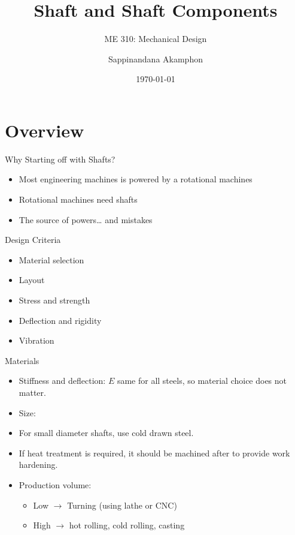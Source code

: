 \documentclass[10pt, svgnames]{beamer}
\author{Sappinandana Akamphon}
\date{\today}
\title{Shaft and Shaft Components}
\subtitle{ME 310: Mechanical Design}
\institute{Department of Mechanical Engineering, TSE}
\date{}
\begin{document}
\maketitle

\section{Overview}
\label{sec:org99923cc}

\begin{frame}[label={sec:org2977922}]{Why Starting off with Shafts?}
\begin{itemize}
\item Most engineering machines is powered by a rotational machines
\item Rotational machines need shafts
\item The source of powers\ldots{}  and mistakes
\end{itemize}
\end{frame}

\begin{frame}[label={sec:org4b2bd09}]{Design Criteria}
\begin{itemize}
\item Material selection
\item Layout
\item Stress and strength
\item Deflection and rigidity
\item Vibration
\end{itemize}
\end{frame}

\begin{frame}[label={sec:org26d80b8}]{Materials}
\begin{itemize}
\item Stiffness and deflection: \(E\) same for all steels, so material choice does not matter.
\item Size:

\item For small diameter shafts, use cold drawn steel.
\item If heat treatment is required, it should be machined after to provide work hardening.

\item Production volume:

\begin{itemize}
\item Low \(\rightarrow\) Turning (using lathe or CNC)
\item High \(\rightarrow\) hot rolling, cold rolling, casting
\end{itemize}
\end{itemize}
\end{frame}
\end{document}
